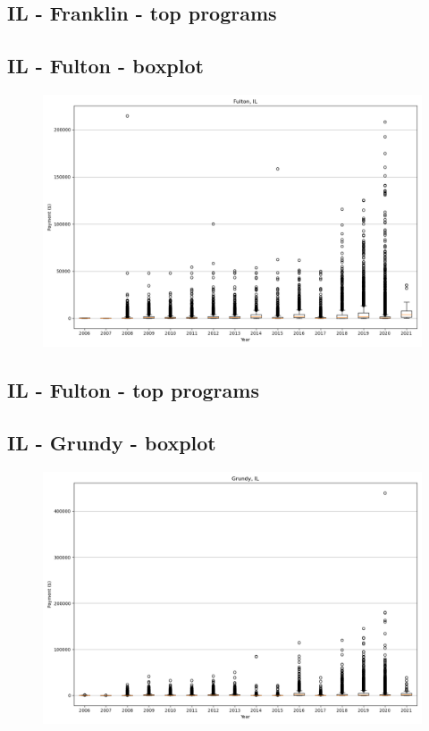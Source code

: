 \subsection*{IL - Franklin - top programs}

\newpage
\subsection*{IL - Fulton - boxplot}
\begin{figure}[h]
\centering
\includegraphics[width=7in]{../output/boxplots/counties/Fulton-IL_boxplot.png}
\end{figure}


\subsection*{IL - Fulton - top programs}

\newpage
\subsection*{IL - Grundy - boxplot}
\begin{figure}[h]
\centering
\includegraphics[width=7in]{../output/boxplots/counties/Grundy-IL_boxplot.png}
\end{figure}


